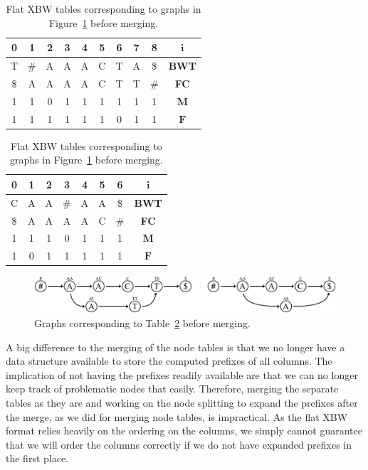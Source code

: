 \documentclass[a4paper,12pt,twoside,BCOR=10mm]{scrbook}
\begin{document}
\begin{table}[htb]
\centering
\caption[Flat XBW tables before merging]{Flat XBW tables corresponding to graphs in Figure~\ref{fig:evo_fig_flat_merge_step_zero} before merging.}
{
\renewcommand{\tabcolsep}{5pt}
\begin{tabular}{ | c | c | c | c | c | c | c | c | c | c | }
\hline
0 & 1 & 2 & 3 & 4 & 5 & 6 & 7 & 8 & $\boldsymbol{i}$ \\ \hline
T & $\#$ & A & A & A & C & T & A & \$ & \textbf{BWT} \\ \hline
\$ & A & A & A & A & C & T & T & $\#$ & \textbf{FC} \\ \hline
1 & 1 & 0 & 1 & 1 & 1 & 1 & 1 & 1 & $\boldsymbol{M}$ \\ \hline
1 & 1 & 1 & 1 & 1 & 1 & 0 & 1 & 1 & $\boldsymbol{F}$ \\ \hline
\end{tabular}
\quad
\begin{tabular}{ | c | c | c | c | c | c | c | c | }
\hline
0 & 1 & 2 & 3 & 4 & 5 & 6 & $\boldsymbol{i}$ \\ \hline
C & A & A & $\#$ & A & A & \$ & \textbf{BWT} \\ \hline
\$ & A & A & A & A & C & $\#$ & \textbf{FC} \\ \hline
1 & 1 & 1 & 0 & 1 & 1 & 1 & $\boldsymbol{M}$ \\ \hline
1 & 0 & 1 & 1 & 1 & 1 & 1 & $\boldsymbol{F}$ \\ \hline
\end{tabular}
}
\label{table:evo_fig_flat_merge_step_zero}
\end{table}
\begin{figure}[!htb]
\centering
\includegraphics[width=\textwidth]{evo_fig_flat_merge_step_zero.pdf}
\caption[Graphs before merging]{Graphs corresponding to Table~\ref{table:evo_fig_flat_merge_step_zero} before merging.} \label{fig:evo_fig_flat_merge_step_zero}
\end{figure}

A big difference to the merging of the node tables is that we no longer have
a data structure available to store the computed prefixes of all columns. 
The implication of not having the prefixes readily available
are that we can no longer keep track of problematic nodes that easily.
Therefore, merging the separate tables as they are and working on the node splitting to expand the prefixes
after the merge, as we did for merging node tables, is impractical.
As the flat XBW format relies heavily on the ordering on the columns,
we simply cannot guarantee that we will order the columns correctly
if we do not have expanded prefixes in the first place.
\end{document}
